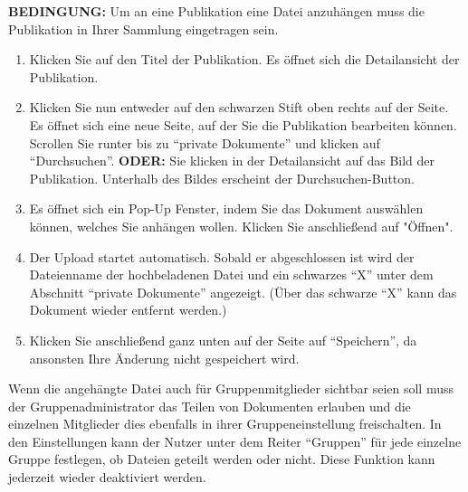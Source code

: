 \begin{shaded} \centering\textbf{BEDINGUNG:} Um an eine Publikation eine Datei anzuhängen muss die Publikation in Ihrer Sammlung eingetragen sein.\end{shaded}
\begin{enumerate}
    \item Klicken Sie auf den Titel der Publikation. Es öffnet sich die Detailansicht der Publikation.
    \item Klicken Sie nun entweder auf den schwarzen Stift oben rechts auf der Seite. Es öffnet sich eine neue Seite, auf der Sie die Publikation bearbeiten können. Scrollen Sie runter bis zu \enquote{private Dokumente} und klicken auf \enquote{Durchsuchen}. \newline \textbf{ODER:} Sie klicken in der Detailansicht auf das Bild der Publikation. Unterhalb des Bildes erscheint der Durchsuchen-Button. 
    \item Es öffnet sich ein Pop-Up Fenster, indem Sie das Dokument auswählen können, welches Sie anhängen wollen. Klicken Sie anschließend auf "Öffnen".
    \item Der Upload startet automatisch. Sobald er abgeschlossen ist wird der Dateienname der hochbeladenen Datei und ein schwarzes \enquote{X} unter dem Abschnitt \enquote{private Dokumente} angezeigt. (Über das schwarze \enquote{X} kann das Dokument wieder entfernt werden.)
    \item Klicken Sie anschließend ganz unten auf der Seite auf \enquote{Speichern}, da ansonsten Ihre Änderung nicht gespeichert wird.
\end{enumerate}
Wenn die angehängte Datei auch für Gruppenmitglieder sichtbar seien soll muss der  Gruppenadministrator das Teilen von Dokumenten erlauben
und die einzelnen Mitglieder dies ebenfalls in ihrer Gruppeneinstellung freischalten. In den Einstellungen kann der Nutzer unter dem Reiter \enquote{Gruppen} für jede einzelne Gruppe festlegen, ob Dateien geteilt werden oder nicht. Diese Funktion kann jederzeit wieder deaktiviert werden.
